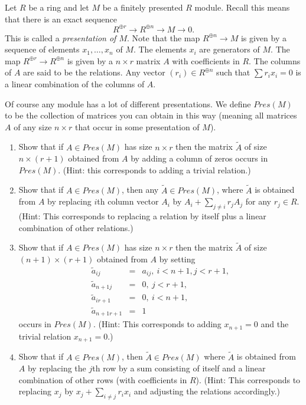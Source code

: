 \begin{exercise}
Let $R$ be a ring and let $M$ be a finitely presented $R$
module. Recall this means that there is an exact sequence
$$
R^{\oplus r} \longrightarrow R^{\oplus n} \longrightarrow M \longrightarrow 0.
$$
This is called a {\it presentation of $M$}.
Note that the map $R^{\oplus n} \to M$
is given by a sequence of elements $x_1,\ldots,x_n$ of $M$. The elements $x_i$
are generators of $M$. The map $R^{\oplus r} \to R^{\oplus n}$ is given by a
$n \times r$ matrix $A$ with coefficients in $R$. The columns of $A$ are said
to be the relations. Any vector $(r_i) \in R^{\oplus n}$ such that
$\sum r_i x_i =0$ is a linear combination of the columns of $A$.

\smallskip\noindent
Of course any module has a lot of different presentations.
We define $Pres(M)$ to be the collection of matrices you can obtain in this
way (meaning all matrices $A$ of any size $n \times r$ that occur in some
presentation of $M$).
\begin{enumerate}
\item Show that if $A\in Pres(M)$ has size $n\times r$ then
the matrix $\tilde A$ of size $n \times (r+1)$ obtained from $A$ by
adding a column of zeros occurs in $Pres(M)$. (Hint: this corresponds
to adding a trivial relation.)
\item Show that if $A\in Pres(M)$, then any $\tilde A \in Pres(M)$,
where $\tilde A$ is obtained from $A$ by replacing $i$th column vector
$A_i$ by $A_i + \sum_{j\not=i} r_j A_j$ for any $r_j \in R$. (Hint: This
corresponds to replacing a relation by itself plus a linear combination of
other relations.)
\item Show that if $A\in Pres(M)$ has size $n\times r$ then
the matrix $\tilde A$ of size $(n+1) \times (r+1)$ obtained from $A$ 
by setting
\begin{eqnarray*}
\tilde a_{ij}      & = & a_{ij},\ i<n+1, j<r+1,\\
\tilde a_{n+1 j}   & = & 0,\ j<r+1,\\
\tilde a_{i r+1}   & = & 0,\ i<n+1,\\
\tilde a_{n+1 r+1} & = & 1
\end{eqnarray*}
occurs in $Pres(M)$. (Hint: This corresponds to adding $x_{n+1}=0$ and
the trivial relation $x_{n+1}=0$.)
\item Show that if $A\in Pres(M)$, then $\tilde A \in Pres(M)$
where $\tilde A$ is obtained from $A$ by replacing the $j$th row
by a sum consisting of itself and a linear combination of other
rows (with coefficients in $R$). (Hint: This corresponds to replacing
$x_j$ by $x_j + \sum_{i\not = j} r_i x_i$ and adjusting the relations
accordingly.)


\end{enumerate}
\end{exercise}
